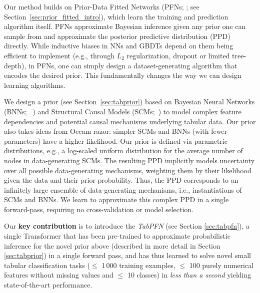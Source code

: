 Our method builds on Prior-Data Fitted Networks (PFNs; \citealp{muller-iclr22a}; see Section~\ref{sec:prior_fitted_intro}), which learn the training and prediction algorithm itself. PFNs approximate Bayesian inference given any prior one can sample from and approximate the posterior predictive distribution (PPD) directly. While inductive biases in NNs and GBDTs depend on them being efficient to implement (e.g., through $L_2$ regularization, dropout \citep{srivastava-jmlr14a} or limited tree-depth), in PFNs, one can simply design a dataset-generating algorithm that encodes the desired prior. This fundamentally changes the way we can design learning algorithms.

We design a prior (see Section~\ref{sec:tabprior}) based on Bayesian Neural Networks (BNNs; ~\citealt{neal-bayes96a,gal-phdthesis16a}) and Structural Causal Models (SCMs;~\citealt{pearl_2009,causalinferencelearningbook}) to model complex feature dependencies and potential causal mechanisms underlying tabular data. Our prior also takes ideas from Occam razor: simpler SCMs and BNNs (with fewer parameters) have a higher likelihood. Our prior is defined via parametric distributions, e.g., a log-scaled uniform distribution for the average number of nodes in data-generating SCMs. The resulting PPD implicitly models uncertainty over all possible data-generating mechanisms, weighting them by their likelihood given the data and their prior probability. Thus, the PPD corresponds to an infinitely large ensemble of data-generating mechanisms, i.e., instantiations of SCMs and BNNs. We learn to approximate this complex PPD in a single forward-pass, requiring no cross-validation or model selection.

Our \textbf{key contribution} is to introduce the \emph{TabPFN} (see Section \ref{sec:tabpfn}), a single Transformer that has been pre-trained to approximate probabilistic inference for the novel prior above (described in more detail in Section \ref{sec:tabprior}) in a single forward pass, and has thus learned to solve novel small tabular classification tasks ($\le$ 1\,000 training examples, $\le$ 100 purely numerical features without missing values and $\le$ 10 classes) in \emph{less than a second} yielding state-of-the-art performance.

